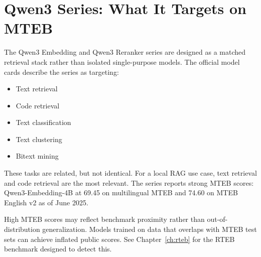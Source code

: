 \section{Qwen3 Series: What It Targets on MTEB}

The Qwen3 Embedding and Qwen3 Reranker series are designed as a matched retrieval stack
rather than isolated single-purpose models. The official model cards describe the series as
targeting:

\begin{itemize}
    \item Text retrieval
    \item Code retrieval
    \item Text classification
    \item Text clustering
    \item Bitext mining
\end{itemize}

These tasks are related, but not identical. For a local RAG use case, text retrieval and code
retrieval are the most relevant. The series reports strong MTEB scores: Qwen3-Embedding-4B
at 69.45 on multilingual MTEB and 74.60 on MTEB English v2 as of June 2025.

\begin{warningbox}
High MTEB scores may reflect benchmark proximity rather than out-of-distribution
generalization. Models trained on data that overlaps with MTEB test sets can achieve inflated
public scores. See Chapter~\ref{ch:rteb} for the RTEB benchmark designed to detect this.
\end{warningbox}
